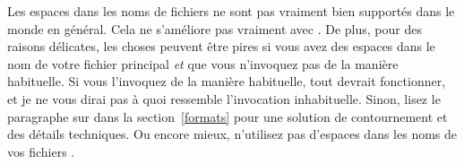 \documentclass{lltxdoc}
\begin{document}
Les espaces dans les noms de fichiers ne sont pas vraiment bien supportés dans le monde \tex en général. Cela ne s'améliore pas vraiment avec \luatex. De plus, pour des raisons délicates, les choses peuvent être pires si vous avez des espaces dans le nom de votre fichier \tex principal \emph{et} que vous n'invoquez pas \luatex de la manière habituelle. Si vous l'invoquez de la manière habituelle, tout devrait fonctionner, et je ne vous dirai pas à quoi ressemble l'invocation inhabituelle. Sinon, lisez le paragraphe sur  dans la section~\ref{formats} pour une solution de contournement et des détails techniques. Ou encore mieux, n'utilisez pas d'espaces dans les noms de vos fichiers \tex.
\end{document}
